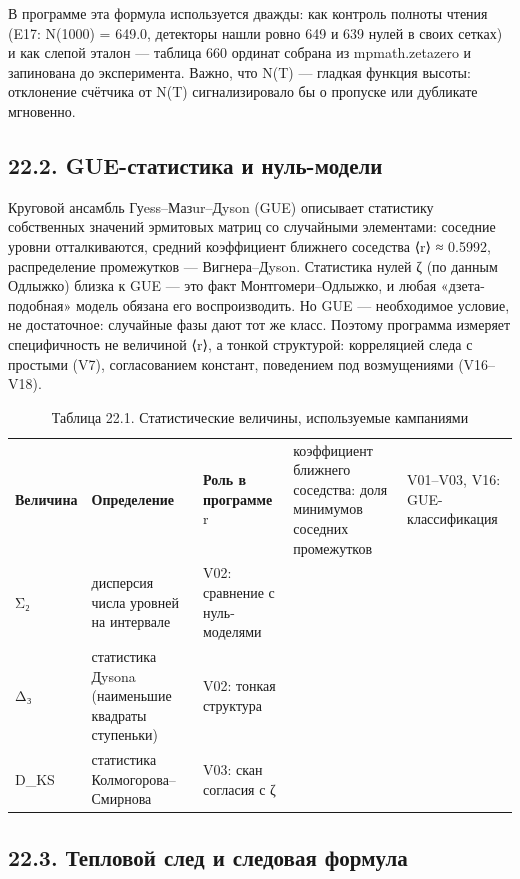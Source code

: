 \documentclass[11pt,a4paper]{article}
\begin{document}
В программе эта формула используется дважды: как контроль полноты чтения (E17: N(1000) = 649.0, детекторы нашли ровно 649 и 639 нулей в своих сетках) и как слепой эталон — таблица 660 ординат собрана из mpmath.zetazero и запинована до эксперимента. Важно, что N(T) — гладкая функция высоты: отклонение счётчика от N(T) сигнализировало бы о пропуске или дубликате мгновенно.

\subsection{22.2. GUE-статистика и нуль-модели}

Круговой ансамбль Гуess–Мазur–Дyson (GUE) описывает статистику собственных значений эрмитовых матриц со случайными элементами: соседние уровни отталкиваются, средний коэффициент ближнего соседства ⟨r⟩ ≈ 0.5992, распределение промежутков — Вигнера–Дyson. Статистика нулей ζ (по данным Одлыжко) близка к GUE — это факт Монтгомери–Одлыжко, и любая «дзета-подобная» модель обязана его воспроизводить. Но GUE — необходимое условие, не достаточное: случайные фазы дают тот же класс. Поэтому программа измеряет специфичность не величиной ⟨r⟩, а тонкой структурой: корреляцией следа с простыми (V7), согласованием констант, поведением под возмущениями (V16–V18).

\begin{table}[htbp]\centering\small
\caption{Таблица 22.1. Статистические величины, используемые кампаниями}
\begin{tabular}{p{} p{} p{}}
\toprule
\textbf{Величина} & \textbf{Определение} & \textbf{Роль в программе}
\midrule
r & коэффициент ближнего соседства: доля минимумов соседних промежутков & V01–V03, V16: GUE-классификация \\
Σ₂ & дисперсия числа уровней на интервале & V02: сравнение с нуль-моделями \\
Δ₃ & статистика Дysona (наименьшие квадраты ступеньки) & V02: тонкая структура \\
D\_KS & статистика Колмогорова–Смирнова & V03: скан согласия с ζ \\
\bottomrule
\end{tabular}
\end{table}

\subsection{22.3. Тепловой след и следовая формула}
\end{document}
